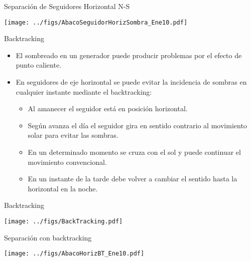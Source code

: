 \documentclass[aspectratio=169, usenames,svgnames,dvipsnames]{beamer}
\begin{document}
\begin{frame}[label={sec:org0553353}]{Separación de Seguidores Horizontal N-S}
\begin{center}
\texttt{[image: ../figs/AbacoSeguidorHorizSombra\_Ene10.pdf]}
\end{center}
\end{frame}

\begin{frame}[label={sec:orga4cc589}]{Backtracking}
\begin{itemize}
\item El \alert{sombreado} en un generador puede producir problemas por el efecto
de \alert{punto caliente}.

\item En seguidores de eje horizontal se puede \alert{evitar la incidencia de
sombras} en cualquier instante mediante el \guillemotleft{}\alert{backtracking}\guillemotright{}:

\begin{itemize}
\item Al \alert{amanecer} el seguidor está en posición \alert{horizontal}.

\item Según avanza el día el seguidor gira en \alert{sentido contrario al
movimiento solar para evitar las sombras}.

\item En un determinado momento se cruza con el sol y puede continuar el
movimiento \guillemotleft{}convencional\guillemotright{}.

\item En un instante de la tarde debe volver a cambiar el sentido hasta
la \alert{horizontal en la noche}.
\end{itemize}
\end{itemize}
\end{frame}

\begin{frame}[label={sec:org6255f7d}]{Backtracking}
\begin{center}
\texttt{[image: ../figs/BackTracking.pdf]}
\end{center}
\end{frame}

\begin{frame}[label={sec:org2649b2a}]{Separación con backtracking}
\begin{center}
\texttt{[image: ../figs/AbacoHorizBT\_Ene10.pdf]}
\end{center}
\end{frame}
\end{document}
